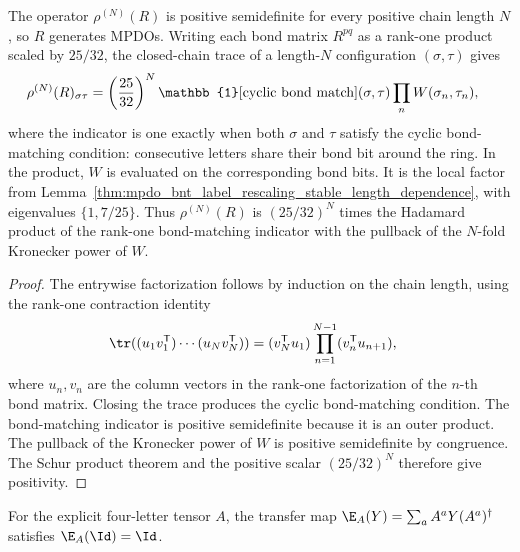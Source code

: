 \begin{lemma}%
    \label{thm:mpdo_bnt_label_rescaling_stable_ismpdo}
    \leanok
    The operator $\rho^{(N)}(R)$ is positive semidefinite for every
    positive chain length $N$, so $R$ generates MPDOs. Writing each bond matrix
    $R^{pq}$ as a rank-one product scaled by $25/32$, the closed-chain trace
    of a length-$N$ configuration $(\sigma,\tau)$ gives
    \begin{align}
        \rho^{(N)}(R)_{\sigma\tau}
         & =\left(\frac{25}{32}\right)^N
        \mathbb{1}[\text{cyclic bond match}](\sigma,\tau)
        \prod_n W(\sigma_n,\tau_n),
        \notag
    \end{align}
    where the indicator is one exactly when both $\sigma$ and $\tau$
    satisfy the cyclic bond-matching condition: consecutive letters share
    their bond bit around the ring. In the product, $W$ is evaluated on
    the corresponding bond bits. It is the local factor from
    Lemma~\ref{thm:mpdo_bnt_label_rescaling_stable_length_dependence},
    with eigenvalues $\{1,7/25\}$. Thus $\rho^{(N)}(R)$ is $(25/32)^N$ times
    the Hadamard product of the rank-one bond-matching indicator with the
    pullback of the $N$-fold Kronecker power of $W$.
\end{lemma}
\begin{proof}\leanok
    The entrywise factorization follows by induction on the chain
    length, using the rank-one contraction identity
    \begin{align}
        \tr((u_1v_1^{\mathsf T})\cdots(u_Nv_N^{\mathsf T}))
         & =(v_N^{\mathsf T}u_1)\prod_{n=1}^{N-1}(v_n^{\mathsf T}u_{n+1}),
        \notag
    \end{align}
    where $u_n,v_n$ are the column vectors in the rank-one factorization
    of the $n$-th bond matrix. Closing the trace produces the cyclic
    bond-matching condition. The bond-matching indicator is positive
    semidefinite because it is an outer product. The pullback of the
    Kronecker power of $W$ is positive semidefinite by congruence.
    The Schur product theorem and the positive scalar $(25/32)^N$
    therefore give positivity.
\end{proof}

\begin{lemma}%
    \label{thm:mpdo_rescaling_transfer_unital}
    \leanok
    For the explicit four-letter tensor $A$, the transfer map
    $\E_A(Y)=\sum_a A^aY(A^a)^\dagger$ satisfies $\E_A(\Id)=\Id$.
\end{lemma}

